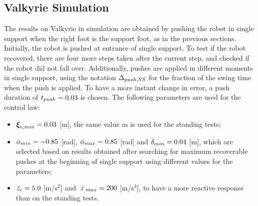 \subsection{Valkyrie Simulation}
The results on Valkyrie in simulation are obtained by pushing the robot in single support when the right foot is the support foot, as in the previous sections. Initially, the robot is pushed at entrance of single support. To test if the robot recovered, there are four more steps taken after the current step, and checked if the robot did not fall over. Additionally, pushes are applied in different moments in single support, using the notation $\Delta_{push,SS}$ for the fraction of the swing time when the push is applied. To have a more instant change in error, a push duration of $t_{push}=0.03$ is chosen. The following parameters are used for the control law:
\begin{itemize}
\item $\boldsymbol{\xi}_{e,min}=0.03$ [m], the same value as is used for the standing tests;
\item $\phi_{min}=-0.85$ [rad], $\phi_{max}=0.85$ [rad] and $\delta_{min}=0.04$ [m], which are selected based on results obtained after searching for maximum recoverable pushes at the beginning of single support using different values for the parameters;
\item $\ddot{z}_{c}=5.0$ [m/s$^2$] and $\dddot{z}_{max}=200$ [m/s$^3$], to have a more reactive response than on the standing tests.
\end{itemize}

  

